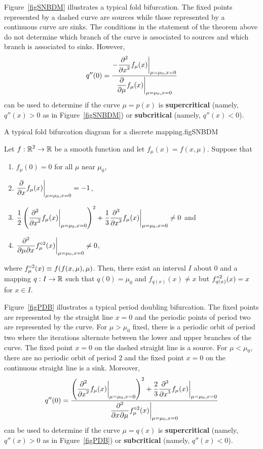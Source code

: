 Figure~\ref{figSNBDM} illustrates a typical fold bifurcation.  The fixed
points represented by a dashed curve are sources while those
represented by a continuous curve are sinks.  The conditions in the
statement of the theorem above do not determine which branch of the
curve is associated to sources and which branch is associated to
sinks.  However,
\[
q''(0) = \frac{\DS -\pdfdxn{f_{\mu}(x)}{x}{2}\bigg|_{\mu=\mu_0,x=0}}
{\DS \pdfdx{f_{\mu}(x)}{\mu}\bigg|_{\mu=\mu_0,x=0}}
\]
can be used to determine if the curve $\mu=p(x)$ is
{\bfseries supercritical}\label{Supercritical} (namely, $q''(x)>0$ as in
Figure~\ref{figSNBDM}) or {\bfseries subcritical}
(namely, $q''(x)<0$).

{A typical fold bifurcation diagram for a discrete mapping.}{figSNBDM}

\begin{theorem}  \label{ThePDTforM}
Let $\DS f:\RR^2 \rightarrow \RR$ be a smooth function and let
$f_\mu(x)= f(x,\mu)$.  Suppose that
\begin{enumerate}
\item $f_{\mu}(0)=0$ for all $\mu$ near $\mu_0$,
\item $\DS \pdfdx{f_{\mu}(x)}{x}\bigg|_{\mu=\mu_0,x=0} = -1$,
\item
$\DS \frac{1}{2}
\left(\pdfdxn{f_{\mu}(x)}{x}{2}\bigg|_{\mu=\mu_0,x=0}\right)^2
+\frac{1}{3} \pdfdxn{f_{\mu}(x)}{x}{3}\bigg|_{\mu=\mu_0,x=0} \neq 0$
and
\item $\DS \pdfdxnm{f_{\mu}^{\circ 2}(x)}{\mu}{x}{2}{}{}
\bigg|_{\mu=\mu_0,x=0} \not=0$,
\end{enumerate}
where $\DS f^{\circ 2}_\mu(x) \equiv f(f(x,\mu),\mu)$.  Then, there exist
an interval $I$ about $0$ and a mapping $q:I\rightarrow \RR$ such that
$q(0) = \mu_0$ and $f_{q(x)}(x) \neq x$ but $\DS f^{\circ 2}_{q(x)}(x) = x$
for $x \in I$.
\end{theorem}

Figure~\ref{figPDB} illustrates a typical period doubling bifurcation.
The fixed points are represented by the straight line $x=0$ and the periodic
points of period two are represented by the curve.   For $\mu > \mu_0$ fixed,
there is a periodic orbit of period two where the iterations alternate
between the lower and upper branches of the curve.  The fixed point
$x=0$ on the dashed straight line is a source.  For $\mu < \mu_0$,
there are no periodic orbit of period $2$ and the fixed point $x=0$ on
the continuous straight line is a sink.  Moreover,
\[
  q''(0) = \frac{\DS
\left(\pdfdxn{f_{\mu}(x)}{x}{2}\bigg|_{\mu=\mu_0,x=0}\right)^2
+\frac{2}{3} \pdfdxn{f_{\mu}(x)}{x}{3}\bigg|_{\mu=\mu_0,x=0}}
{\DS \pdfdxnm{f^{\circ 2}_{\mu}(x)}{x}{\mu}{2}{}{}\bigg|_{\mu=\mu_0,x=0}}
\]
can be used to determine if the curve $\mu=q(x)$ is
{\bfseries supercritical} (namely, $q''(x)>0$ as in
Figure~\ref{figPDB}) or {\bfseries subcritical}
(namely, $q''(x)<0$).

